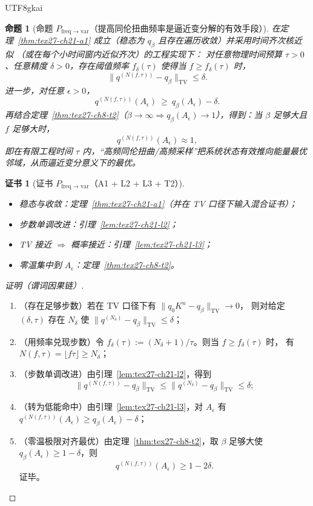 \documentclass[12pt]{article}
\newtheorem{proposition}{命题}[section]
\newtheorem{Certificate}{证书}[section]
\begin{document}
\begin{CJK*}{UTF8}{gkai}
\begin{proposition}[命题 $P_{\mathrm{freq\to var}}$（提高同伦扭曲频率是逼近变分解的有效手段）]
\label{prop:tex27-ch21-freq-to-var}
在定理~\ref{thm:tex27-ch21-a1} 成立（稳态为 $q_\beta$ 且存在遍历收敛）并采用时间齐次核近似
（或在每个小时间窗内近似齐次）的工程实现下：
对任意物理时间预算 $\tau>0$、任意精度 $\delta>0$，存在阈值频率 $f_\delta(\tau)$ 使得当 $f\ge f_\delta(\tau)$ 时，
\[
  \bigl\|q^{(N(f,\tau))}-q_\beta\bigr\|_{\mathrm{TV}}\le \delta.
\]
进一步，对任意 $\epsilon>0$，
\[
  q^{(N(f,\tau))}(A_\epsilon)\ \ge\ q_\beta(A_\epsilon)-\delta.
\]
再结合定理~\ref{thm:tex27-ch8-t2}（$\beta\to\infty\Rightarrow q_\beta(A_\epsilon)\to 1$），得到：当 $\beta$ 足够大且 $f$ 足够大时，
\[
  q^{(N(f,\tau))}(A_\epsilon)\approx 1,
\]
即在有限工程时间 $\tau$ 内，“高频同伦扭曲/高频采样”把系统状态有效推向能量最优邻域，从而逼近变分意义下的最优。
\end{proposition}

\begin{Certificate}[证书 $P_{\mathrm{freq\to var}}$（A1 + L2 + L3 + T2）]
\label{cert:tex27-ch21-freq-to-var}
\begin{itemize}
  \item 稳态与收敛：定理~\ref{thm:tex27-ch21-a1}（并在 TV 口径下输入混合证书）；
  \item 步数单调改进：引理~\ref{lem:tex27-ch21-l2}；
  \item TV 接近 $\Rightarrow$ 概率接近：引理~\ref{lem:tex27-ch21-l3}；
  \item 零温集中到 $A_\epsilon$：定理~\ref{thm:tex27-ch8-t2}。
\end{itemize}
\end{Certificate}

\begin{proof}[证明（谓词因果链）]
\begin{enumerate}
  \item（存在足够步数）若在 TV 口径下有 $\|q_0K^n-q_\beta\|_{\mathrm{TV}}\to 0$，
  则对给定 $(\delta,\tau)$ 存在 $N_\delta$ 使
  $\|q^{(N_\delta)}-q_\beta\|_{\mathrm{TV}}\le \delta$；
  \item（用频率兑现步数）令 $f_\delta(\tau):=(N_\delta+1)/\tau$。则当 $f\ge f_\delta(\tau)$ 时，
  有 $N(f,\tau)=\lfloor f\tau\rfloor\ge N_\delta$；
  \item（步数单调改进）由引理~\ref{lem:tex27-ch21-l2}，得到
  \[
    \|q^{(N(f,\tau))}-q_\beta\|_{\mathrm{TV}}
    \le \|q^{(N_\delta)}-q_\beta\|_{\mathrm{TV}}
    \le \delta;
  \]
  \item（转为低能命中）由引理~\ref{lem:tex27-ch21-l3}，对 $A_\epsilon$ 有
  $
    q^{(N(f,\tau))}(A_\epsilon)\ge q_\beta(A_\epsilon)-\delta
  $；
  \item（零温极限对齐最优）由定理~\ref{thm:tex27-ch8-t2}，取 $\beta$ 足够大使 $q_\beta(A_\epsilon)\ge 1-\delta$，则
  \[
    q^{(N(f,\tau))}(A_\epsilon)\ge 1-2\delta.
  \]
  证毕。
\end{enumerate}
\end{proof}


\end{CJK*}
\end{document}

